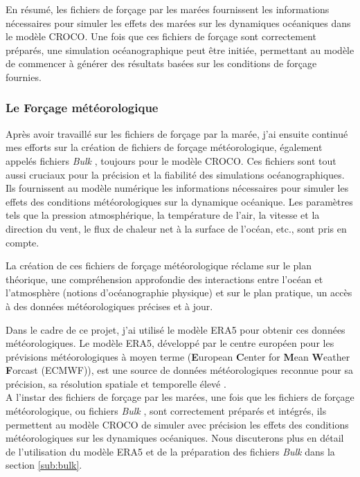 En résumé, les fichiers de forçage par les marées fournissent les informations nécessaires pour simuler les effets des marées sur les dynamiques océaniques dans le modèle CROCO. Une fois que ces fichiers de forçage sont correctement préparés, une simulation océanographique peut être initiée, permettant au modèle de commencer à générer des résultats basées sur les conditions de forçage fournies.

\subsubsection{Le Forçage météorologique}

Après avoir travaillé sur les fichiers de forçage par la marée, j'ai ensuite continué mes efforts sur la création de fichiers de forçage météorologique, également appelés fichiers \og \textit{Bulk} \fg{}, toujours pour le modèle CROCO. Ces fichiers sont tout aussi cruciaux pour la précision et la fiabilité des simulations océanographiques. Ils fournissent au modèle numérique les informations nécessaires pour simuler les effets des conditions météorologiques sur la dynamique océanique. Les paramètres tels que la pression atmosphérique, la température de l'air, la vitesse et la direction du vent, le flux de chaleur net à la surface de l'océan, etc., sont pris en compte.

La création de ces fichiers de forçage météorologique réclame sur le plan théorique, une compréhension approfondie des interactions entre l'océan et l'atmosphère (notions d'océanographie physique) et sur le plan pratique, un accès à des données météorologiques précises et à jour.

Dans le cadre de ce projet, j'ai utilisé le modèle ERA5 \citep{ERA5} pour obtenir ces données météorologiques. Le modèle ERA5, développé par le centre européen pour les prévisions météorologiques à moyen terme (\textbf{E}uropean \textbf{C}enter for \textbf{M}ean \textbf{W}eather \textbf{F}orcast (ECMWF)), est une source de données météorologiques reconnue pour sa précision, sa résolution spatiale et temporelle élevé \citep{CROCOForum2022, Donoso2022}.\\

A l'instar des fichiers de forçage par les marées, une fois que les fichiers de forçage météorologique, ou fichiers \og \textit{Bulk} \fg{}, sont correctement préparés et intégrés, ils permettent au modèle CROCO de simuler avec précision les effets des conditions météorologiques sur les dynamiques océaniques. Nous discuterons plus en détail de l'utilisation du modèle ERA5 et de la préparation des fichiers \og \textit{Bulk} \fg{} dans la section \ref{sub:bulk}.

